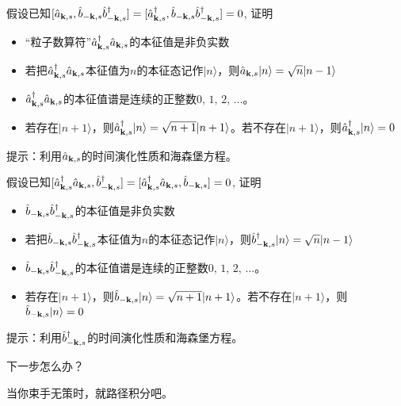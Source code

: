 \documentclass[CJK]{beamer}
\begin{document}
\begin{frame}
\bch
假设已知$[{\hat{a}}_{{\mathbf{k}},s},{\hat{b}}_{-{\mathbf{k}},s}{\hat{b}^\dagger}_{-{\mathbf{k}},s}]=[{\hat{a}^\dagger}_{{\mathbf{k}},s},{\hat{b}}_{-{\mathbf{k}},s}{\hat{b}^\dagger}_{-{\mathbf{k}},s}]=0$, 证明

\begin{itemize}
\item{“粒子数算符”${\hat{a}^\dagger}_{{\mathbf{k}},s}{\hat{a}}_{{\mathbf{k}},s}$的本征值是非负实数}
\item{若把${\hat{a}^\dagger}_{{\mathbf{k}},s}{\hat{a}}_{{\mathbf{k}},s}$本征值为$n$的本征态记作$|n\rangle$，则${\hat{a}}_{{\mathbf{k}},s}|n\rangle = \sqrt{n}|n-1\rangle$}
\item{${\hat{a}^\dagger}_{{\mathbf{k}},s}{\hat{a}}_{{\mathbf{k}},s}$的本征值谱是连续的正整数$0,\, 1,\, 2,\, \ldots$。}
\item{若存在$|n+1\rangle$，则${\hat{a}^\dagger}_{{\mathbf{k}},s}|n\rangle = \sqrt{n+1}|n+1\rangle$。若不存在$|n+1\rangle$，则${\hat{a}^\dagger}_{{\mathbf{k}},s}|n\rangle =0$}
\end{itemize}

\skipline

提示：利用${\hat{a}}_{{\mathbf{k}},s}$的时间演化性质和海森堡方程。
\ech
\end{frame}


\begin{frame}
\bch
假设已知$[{\hat{a}^\dagger}_{{\mathbf{k}},s}{\hat{a}}_{{\mathbf{k}},s},{\hat{b}^\dagger}_{-{\mathbf{k}},s}]=[{\hat{a}^\dagger}_{{\mathbf{k}},s}{\hat{a}}_{{\mathbf{k}},s},{\hat{b}}_{-{\mathbf{k}},s}]=0$, 证明

\begin{itemize}
\item{${\hat{b}}_{-{\mathbf{k}},s}{\hat{b}^\dagger}_{-{\mathbf{k}},s}$的本征值是非负实数}
\item{若把${\hat{b}}_{-{\mathbf{k}},s}{\hat{b}^\dagger}_{-{\mathbf{k}},s}$本征值为$n$的本征态记作$|n\rangle$，则${\hat{b}^\dagger}_{-{\mathbf{k}},s}|n\rangle = \sqrt{n}|n-1\rangle$}
\item{${\hat{b}}_{-{\mathbf{k}},s}{\hat{b}^\dagger}_{-{\mathbf{k}},s}$的本征值谱是连续的正整数$0,\, 1,\, 2,\, \ldots$。}
\item{若存在$|n+1\rangle$，则${\hat{b}}_{-{\mathbf{k}},s}|n\rangle = \sqrt{n+1}|n+1\rangle$。若不存在$|n+1\rangle$，则${\hat{b}}_{-{\mathbf{k}},s}|n\rangle =0$}
\end{itemize}

\skipline

提示：利用${\hat{b}^\dagger}_{-{\mathbf{k}},s}$的时间演化性质和海森堡方程。
\ech
\end{frame}


\begin{frame}
\bch
下一步怎么办？
\ech
\end{frame}


\begin{frame}
\bch
当你束手无策时，就路径积分吧。
\ech
\end{frame}
\end{document}
